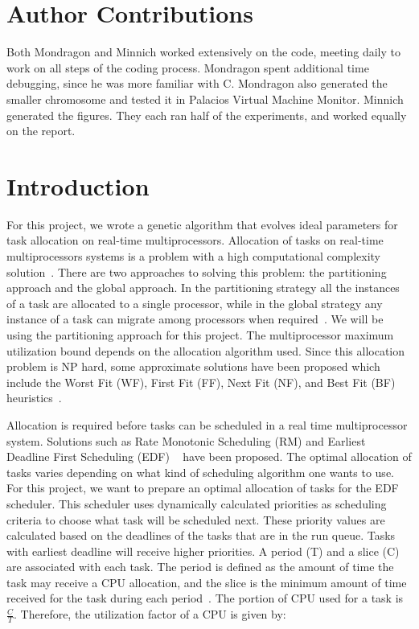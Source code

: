 \documentclass[11pt]{article}
\begin{document}
\maketitle
\doublespacing

\section{Author Contributions}
Both Mondragon and Minnich worked extensively on the code, meeting daily to work on all steps of the coding process. Mondragon spent additional time debugging, since he was more familiar with C. Mondragon also generated the smaller chromosome and tested it in Palacios Virtual Machine Monitor. Minnich generated the figures. They each ran half of the experiments, and worked equally on the report. 

\section{Introduction}

For this project, we wrote a genetic algorithm that evolves ideal parameters for task allocation on real-time multiprocessors. Allocation of tasks on real-time multiprocessors systems is a problem with a high computational complexity solution~\cite{Mondragon:13}. There are two approaches to solving this problem: the partitioning approach and the global approach. In the partitioning strategy all the instances of a task are allocated to a single processor, while in the global strategy any instance of a task can migrate among processors when required~\cite{Lopez:04}. We will be using the partitioning approach for this project. The multiprocessor maximum utilization bound depends on the allocation algorithm used. Since this allocation problem is NP hard, some approximate solutions have been proposed which include the Worst Fit (WF), First Fit (FF), Next Fit (NF), and Best Fit (BF) heuristics~\cite{Zapata:05}. 

Allocation is required before tasks can be scheduled in a real time multiprocessor system. Solutions such as Rate Monotonic Scheduling (RM) and Earliest Deadline First Scheduling (EDF) ~\cite{Dall:78} have been proposed. The optimal allocation of tasks varies depending on what kind of scheduling algorithm one wants to use. For this project, we want to prepare an optimal allocation of tasks for the EDF scheduler. This scheduler uses dynamically calculated priorities as scheduling criteria to choose what task will be scheduled next. These priority values are calculated based on the deadlines of the tasks that are in the run queue. Tasks with earliest deadline will receive higher priorities. A period (T) and a slice (C) are associated with each task. The period is defined as the amount of time the task may receive a CPU allocation, and the slice is the minimum amount of time received for the task during each period~\cite{Chung:73}. The portion of CPU used for a task is $\frac{C}{T}$. Therefore, the utilization factor of a CPU is given by: 
\end{document}
